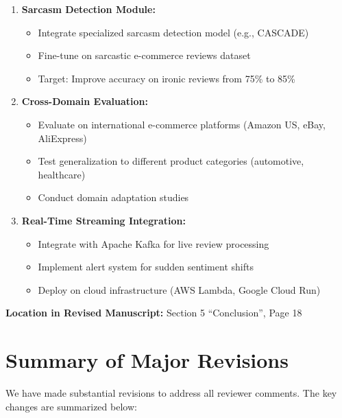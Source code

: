 \documentclass[11pt,a4paper]{article}
\begin{document}
\begin{itemize}[leftmargin=*]
\begin{enumerate}
        \item \textbf{Sarcasm Detection Module:}
        \begin{itemize}
            \item Integrate specialized sarcasm detection model (e.g., CASCADE)
            \item Fine-tune on sarcastic e-commerce reviews dataset
            \item Target: Improve accuracy on ironic reviews from 75\% to 85\%
        \end{itemize}
        
        \item \textbf{Cross-Domain Evaluation:}
        \begin{itemize}
            \item Evaluate on international e-commerce platforms (Amazon US, eBay, AliExpress)
            \item Test generalization to different product categories (automotive, healthcare)
            \item Conduct domain adaptation studies
        \end{itemize}
        
        \item \textbf{Real-Time Streaming Integration:}
        \begin{itemize}
            \item Integrate with Apache Kafka for live review processing
            \item Implement alert system for sudden sentiment shifts
            \item Deploy on cloud infrastructure (AWS Lambda, Google Cloud Run)
        \end{itemize}
    \end{enumerate}
\end{itemize}

\textbf{Location in Revised Manuscript:} Section 5 ``Conclusion'', Page 18


\section*{Summary of Major Revisions}

We have made substantial revisions to address all reviewer comments. The key changes are summarized below:
\end{document}
